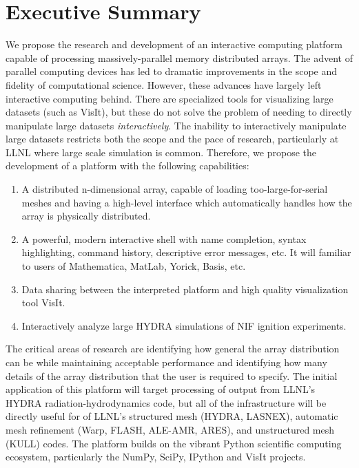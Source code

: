 \documentclass[letterpaper,11pt]{article}
\begin{document}


\setlength{\parindent}{15pt}

\section*{Executive Summary }
We propose the research and development of an interactive computing platform capable of 
processing massively-parallel memory distributed arrays.  The advent of parallel 
computing devices has led to dramatic improvements in the scope and fidelity of 
computational science.  However, these advances have largely left interactive computing 
behind.  There are specialized tools for visualizing large datasets (such as 
VisIt\cite{VisIt}), but these do not solve the problem of needing to directly manipulate 
large datasets \emph{interactively}.  The inability to interactively manipulate large 
datasets restricts both the scope and the pace of research, particularly at LLNL where 
large scale simulation is common.  Therefore, we propose the development of a platform 
with the following capabilities:

\begin{enumerate}
	\item A distributed n-dimensional array, capable of loading too-large-for-serial meshes 
          and having a high-level interface which automatically handles how 
          the array is physically distributed.

	\item A powerful, modern interactive shell with name completion, syntax highlighting, 
		command history, descriptive error messages, etc.  It will familiar to users of 
		Mathematica, MatLab, Yorick, Basis, etc.

	\item Data sharing between the interpreted platform and high quality visualization tool VisIt.
		
	\item Interactively analyze large HYDRA simulations of NIF ignition experiments.
\end{enumerate}

The critical areas of research are identifying how general the array distribution can be 
while maintaining acceptable performance and identifying how many details of the array 
distribution that the user is required to specify.  The initial application of this platform 
will target processing of output from LLNL's HYDRA\cite{Marinak2001} radiation-hydrodynamics 
code, but all of the infrastructure will be directly useful for of LLNL's structured mesh 
(HYDRA, LASNEX\cite{Zimmerman1977}), automatic mesh refinement
(Warp\cite{Grote2005}, FLASH\cite{flash}, ALE-AMR\cite{Koniges2010}, ARES),
and unstructured mesh (KULL\cite{Rathkopf2000}) codes.  The platform builds on the vibrant
Python scientific computing ecosystem, particularly the NumPy\cite{Oliphant2006}, 
SciPy\cite{numpyscipy}, IPython\cite{ipython} and VisIt projects.
\end{document}
